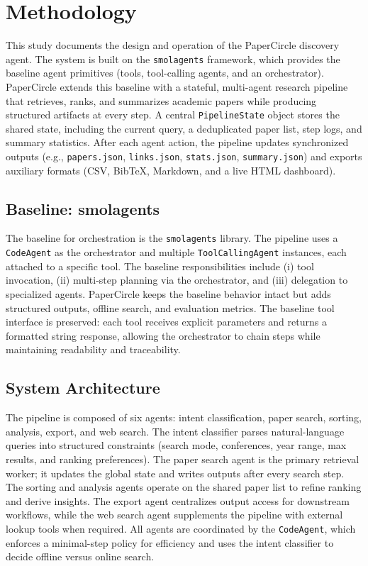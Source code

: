 \section{Methodology}
This study documents the design and operation of the PaperCircle discovery agent. The system is built on the \texttt{smolagents} framework, which provides the baseline agent primitives (tools, tool-calling agents, and an orchestrator). PaperCircle extends this baseline with a stateful, multi-agent research pipeline that retrieves, ranks, and summarizes academic papers while producing structured artifacts at every step. A central \texttt{PipelineState} object stores the shared state, including the current query, a deduplicated paper list, step logs, and summary statistics. After each agent action, the pipeline updates synchronized outputs (e.g., \texttt{papers.json}, \texttt{links.json}, \texttt{stats.json}, \texttt{summary.json}) and exports auxiliary formats (CSV, BibTeX, Markdown, and a live HTML dashboard).

\subsection{Baseline: smolagents}
The baseline for orchestration is the \texttt{smolagents} library. The pipeline uses a \texttt{CodeAgent} as the orchestrator and multiple \texttt{ToolCallingAgent} instances, each attached to a specific tool. The baseline responsibilities include (i) tool invocation, (ii) multi-step planning via the orchestrator, and (iii) delegation to specialized agents. PaperCircle keeps the baseline behavior intact but adds structured outputs, offline search, and evaluation metrics. The baseline tool interface is preserved: each tool receives explicit parameters and returns a formatted string response, allowing the orchestrator to chain steps while maintaining readability and traceability.

\subsection{System Architecture}
The pipeline is composed of six agents: intent classification, paper search, sorting, analysis, export, and web search. The intent classifier parses natural-language queries into structured constraints (search mode, conferences, year range, max results, and ranking preferences). The paper search agent is the primary retrieval worker; it updates the global state and writes outputs after every search step. The sorting and analysis agents operate on the shared paper list to refine ranking and derive insights. The export agent centralizes output access for downstream workflows, while the web search agent supplements the pipeline with external lookup tools when required. All agents are coordinated by the \texttt{CodeAgent}, which enforces a minimal-step policy for efficiency and uses the intent classifier to decide offline versus online search.

